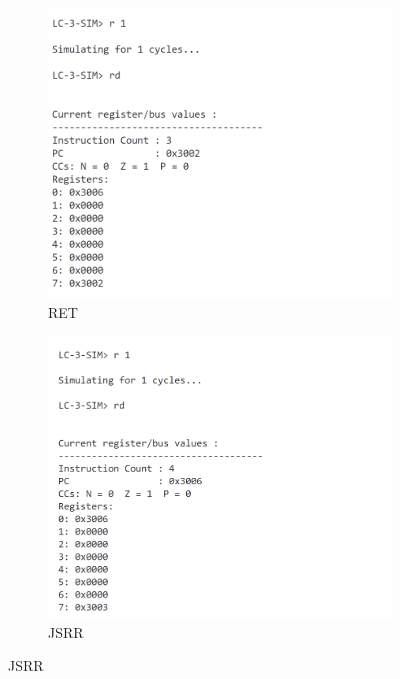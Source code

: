 \documentclass[UTF8]{ctexart}
\begin{document}
\begin{figure}[htbp]
  \begin{subfigure}{0.45\textwidth}
    \includegraphics[width=\linewidth]{jsr3.png}
    \caption{RET}
  \end{subfigure}
  \hfill
  \begin{subfigure}{0.45\textwidth}
    \includegraphics[width=\linewidth]{jsr4.png}
    \caption{JSRR}
  \end{subfigure}

  \vspace{0.5cm}


\end{figure}
\end{document}
